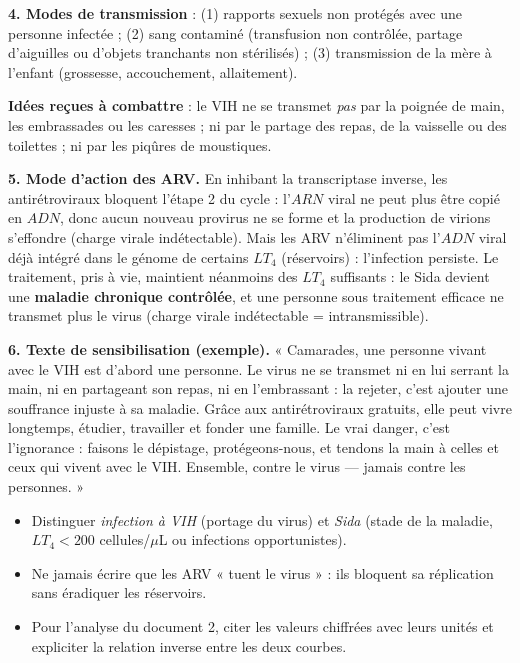 \documentclass[11pt]{article}
\begin{document}
\begin{corrige}
\textbf{4. Modes de transmission} : (1) rapports sexuels non protégés avec une personne infectée ; (2) sang contaminé (transfusion non contrôlée, partage d'aiguilles ou d'objets tranchants non stérilisés) ; (3) transmission de la mère à l'enfant (grossesse, accouchement, allaitement).

\textbf{Idées reçues à combattre} : le VIH ne se transmet \emph{pas} par la poignée de main, les embrassades ou les caresses ; ni par le partage des repas, de la vaisselle ou des toilettes ; ni par les piqûres de moustiques.

\textbf{5. Mode d'action des ARV.} En inhibant la transcriptase inverse, les antirétroviraux bloquent l'étape 2 du cycle : l'$ARN$ viral ne peut plus être copié en $ADN$, donc aucun nouveau provirus ne se forme et la production de virions s'effondre (charge virale indétectable). Mais les ARV n'éliminent pas l'$ADN$ viral déjà intégré dans le génome de certains $LT_4$ (réservoirs) : l'infection persiste. Le traitement, pris à vie, maintient néanmoins des $LT_4$ suffisants : le Sida devient une \textbf{maladie chronique contrôlée}, et une personne sous traitement efficace ne transmet plus le virus (charge virale indétectable = intransmissible).

\textbf{6. Texte de sensibilisation (exemple).} « Camarades, une personne vivant avec le VIH est d'abord une personne. Le virus ne se transmet ni en lui serrant la main, ni en partageant son repas, ni en l'embrassant : la rejeter, c'est ajouter une souffrance injuste à sa maladie. Grâce aux antirétroviraux gratuits, elle peut vivre longtemps, étudier, travailler et fonder une famille. Le vrai danger, c'est l'ignorance : faisons le dépistage, protégeons-nous, et tendons la main à celles et ceux qui vivent avec le VIH. Ensemble, contre le virus — jamais contre les personnes. »
\end{corrige}

\begin{attention}
\begin{itemize}
\item Distinguer \emph{infection à VIH} (portage du virus) et \emph{Sida} (stade de la maladie, $LT_4 < 200$ cellules/$\mu$L ou infections opportunistes).
\item Ne jamais écrire que les ARV « tuent le virus » : ils bloquent sa réplication sans éradiquer les réservoirs.
\item Pour l'analyse du document 2, citer les valeurs chiffrées avec leurs unités et expliciter la relation inverse entre les deux courbes.
\end{itemize}
\end{attention}
\end{document}
